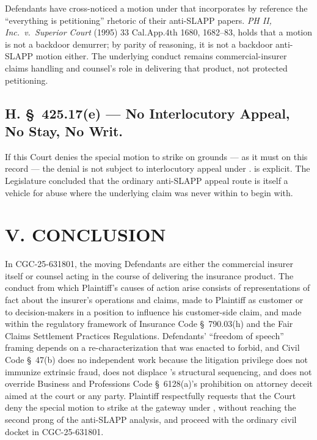 Defendants have cross-noticed a motion under  that incorporates by reference the ``everything is petitioning'' rhetoric of their anti-SLAPP papers. \textit{PH II, Inc.\ v.\ Superior Court} (1995) 33 Cal.App.4th 1680, 1682--83, holds that a  motion is not a backdoor demurrer; by parity of reasoning, it is not a backdoor anti-SLAPP motion either. The underlying conduct remains commercial-insurer claims handling and counsel's role in delivering that product, not protected petitioning.

\subsection*{H. \S~425.17(e) --- No Interlocutory Appeal, No Stay, No Writ.}

If this Court denies the special motion to strike on  grounds --- as it must on this record --- the denial is not subject to interlocutory appeal under .  is explicit. The Legislature concluded that the ordinary anti-SLAPP appeal route is itself a vehicle for abuse where the underlying claim was never within  to begin with.

\section*{V. CONCLUSION}

In CGC-25-631801, the moving Defendants are either the commercial insurer itself or counsel acting in the course of delivering the insurance product. The conduct from which Plaintiff's causes of action arise consists of representations of fact about the insurer's operations and claims, made to Plaintiff as customer or to decision-makers in a position to influence his customer-side claim, and made within the regulatory framework of Insurance Code \S~790.03(h) and the Fair Claims Settlement Practices Regulations. Defendants' ``freedom of speech'' framing depends on a re-characterization that  was enacted to forbid, and Civil Code \S~47(b) does no independent work because the litigation privilege does not immunize extrinsic fraud, does not displace 's structural sequencing, and does not override Business and Professions Code \S~6128(a)'s prohibition on attorney deceit aimed at the court or any party. Plaintiff respectfully requests that the Court deny the special motion to strike at the gateway under , without reaching the second prong of the anti-SLAPP analysis, and proceed with the ordinary civil docket in CGC-25-631801.



